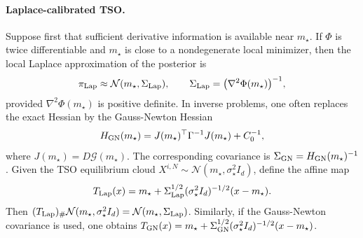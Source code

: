 \documentclass{article}
\numberwithin{equation}{section}
\begin{document}
\paragraph{Laplace-calibrated TSO.}
Suppose first that sufficient derivative information is available near $m_\star$. If $\Phi$ is twice differentiable and $m_\star$ is close to a nondegenerate local minimizer, then the local Laplace approximation of the posterior is
\begin{align}
\pi_{\rm Lap} \approx \mathcal N(m_\star,\Sigma_{\rm Lap}),
\qquad \Sigma_{\rm Lap} = \bigl(\nabla^2\Phi(m_\star)\bigr)^{-1},
\label{eq:tso_laplace_covariance}
\end{align}
provided $\nabla^2\Phi(m_\star)$ is positive definite. In inverse problems, one often replaces the exact Hessian by the Gauss-Newton Hessian
\begin{align}
H_{\rm GN}(m_\star)
=
J(m_\star)^\top\Gamma^{-1}J(m_\star)
+
C_0^{-1},
\label{eq:tso_gn_hessian}
\end{align}
where $J(m_\star)=D\mathcal G(m_\star)$. The corresponding covariance is $\Sigma_{\rm GN}
= H_{\rm GN}(m_\star)^{-1}$. 
Given the TSO equilibrium cloud $X^{i,N}\sim\mathcal N(m_\star,\sigma_\star^2 I_d)$, define the affine map
\begin{align}
T_{\rm Lap}(x)
=
m_\star
+
\Sigma_{\rm Lap}^{1/2}
(\sigma_\star^2 I_d)^{-1/2}
(x-m_\star).
\label{eq:tso_laplace_transport}
\end{align}
Then $(T_{\rm Lap})_\#\mathcal N(m_\star,\sigma_\star^2 I_d) = \mathcal N(m_\star,\Sigma_{\rm Lap})$. Similarly, if the Gauss-Newton covariance is used, one obtains $T_{\rm GN}(x) = m_\star + \Sigma_{\rm GN}^{1/2}(\sigma_\star^2 I_d)^{-1/2}(x-m_\star)$. 
\end{document}
